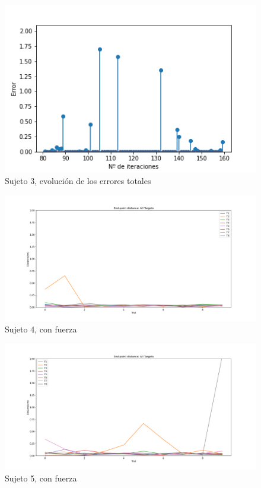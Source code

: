\documentclass[a4paper,11pt, oneside]{book}
\begin{document}
\begin{figure}[H]
	\includegraphics[width=\linewidth]{sujeto3/force/resumen_total}
	\caption{Sujeto 3, evolución de los errores totales}
	\label{3-2-7}
\end{figure}
\begin{figure}[H]
	\includegraphics[width=\linewidth]{sujeto4/force/evolution_distance}
	\caption{Sujeto 4, con fuerza}
	\label{4-2-2}
\end{figure}
\begin{figure}[H]
	\includegraphics[width=\linewidth]{sujeto5/force/evolution_distance}
	\caption{Sujeto 5, con fuerza}
	\label{5-2-2}
\end{figure}
\end{document}
